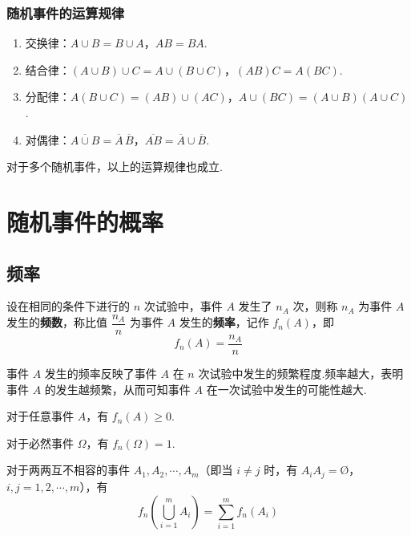 \subsubsection{随机事件的运算规律}

\begin{enumerate}
    \item 交换律：$A \cup B = B \cup A$，$AB=BA$.
    \item 结合律：$(A \cup B) \cup C = A \cup (B \cup C)$，$(AB)C=A(BC)$.
    \item 分配律：$A(B \cup C)=(AB)\cup(AC)$，$A\cup(BC)=(A \cup B)(A \cup C)$.
    \item 对偶律：$\overline{A \cup B}=\overline{A}\,\overline{B}$，$\overline{AB}=\overline{A}\cup\overline{B}$.
\end{enumerate}

对于多个随机事件，以上的运算规律也成立.

\section{随机事件的概率}

\subsection{频率}

\begin{definition}
    设在相同的条件下进行的 $n$ 次试验中，事件 $A$ 发生了 $n_A$ 次，则称 $n_A$ 为事件 $A$ 发生的\textbf{频数}，称比值 $\dfrac{n_A}{n}$ 为事件 $A$ 发生的\textbf{频率}，记作 $f_n(A)$，即
    $$
    f_n(A)=\dfrac{n_A}{n}
    $$
\end{definition}

事件 $A$ 发生的频率反映了事件 $A$ 在 $n$ 次试验中发生的频繁程度.频率越大，表明事件 $A$ 的发生越频繁，从而可知事件 $A$ 在一次试验中发生的可能性越大.

\setcounter{propertyname}{0}

\begin{property}[（非负性）]
    对于任意事件 $A$，有 $f_n(A) \geqslant 0$.
\end{property}

\begin{property}[（规范性）]
    对于必然事件 $\varOmega$，有 $f_n(\varOmega)=1$.
\end{property}

\begin{property}[（有限可加性）]
    对于两两互不相容的事件 $A_1,A_2,\cdots,A_m$（即当 $i\not=j$ 时，有 $A_i A_j = \text{\O}$，$i,j=1,2,\cdots,m$），有
    $$
    f_n(\bigcup_{i=1}^m A_i) = \sum_{i=1}^m f_n(A_i)
    $$
\end{property}

